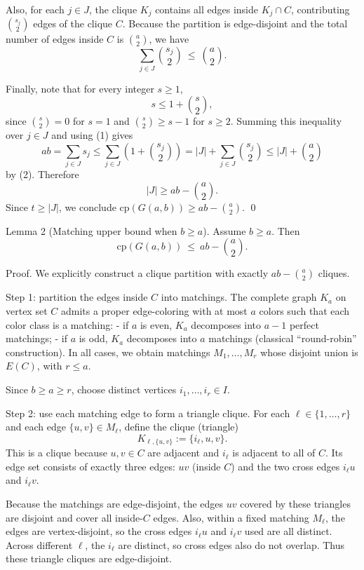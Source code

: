 Also, for each $j\in J$, the clique $K_j$ contains all edges inside $K_j\cap C$, contributing $\binom{s_j}{2}$ edges of the clique $C$.
Because the partition is edge-disjoint and the total number of edges inside $C$ is $\binom{a}{2}$, we have
\[\sum_{j\in J} \binom{s_j}{2} \ \le\ \binom{a}{2}.\tag{2}\]

Finally, note that for every integer $s\ge 1$,
\[s \le 1+\binom{s}{2},\]
since $\binom{s}{2}=0$ for $s=1$ and $\binom{s}{2}\ge s-1$ for $s\ge 2$.
Summing this inequality over $j\in J$ and using (1) gives
\[ab=\sum_{j\in J} s_j \le \sum_{j\in J}\left(1+\binom{s_j}{2}\right)=|J|+\sum_{j\in J}\binom{s_j}{2}\le |J|+\binom{a}{2}\]
by (2). Therefore
\[|J|\ge ab-\binom{a}{2}.\]
Since $t\ge |J|$, we conclude $\mathrm{cp}(G(a,b))\ge ab-\binom{a}{2}$. \qed

Lemma 2 (Matching upper bound when $b\ge a$).
Assume $b\ge a$. Then
\[\mathrm{cp}(G(a,b))\ \le\ ab-\binom{a}{2}.\]

Proof.
We explicitly construct a clique partition with exactly $ab-\binom{a}{2}$ cliques.

Step 1: partition the edges inside $C$ into matchings.
The complete graph $K_a$ on vertex set $C$ admits a proper edge-coloring with at most $a$ colors such that each color class is a matching:
- if $a$ is even, $K_a$ decomposes into $a-1$ perfect matchings;
- if $a$ is odd, $K_a$ decomposes into $a$ matchings (classical ``round-robin'' construction).
In all cases, we obtain matchings $M_1,\dots,M_r$ whose disjoint union is $E(C)$, with $r\le a$.

Since $b\ge a\ge r$, choose distinct vertices $i_1,\dots,i_r\in I$.

Step 2: use each matching edge to form a triangle clique.
For each $\ell\in\{1,\dots,r\}$ and each edge $\{u,v\}\in M_\ell$, define the clique (triangle)
\[K_{\ell,\{u,v\}}:=\{i_\ell,u,v\}.\]
This is a clique because $u,v\in C$ are adjacent and $i_\ell$ is adjacent to all of $C$.
Its edge set consists of exactly three edges: $uv$ (inside $C$) and the two cross edges $i_\ell u$ and $i_\ell v$.

Because the matchings are edge-disjoint, the edges $uv$ covered by these triangles are disjoint and cover all inside-$C$ edges.
Also, within a fixed matching $M_\ell$, the edges are vertex-disjoint, so the cross edges $i_\ell u$ and $i_\ell v$ used are all distinct.
Across different $\ell$, the $i_\ell$ are distinct, so cross edges also do not overlap.
Thus these triangle cliques are edge-disjoint.

